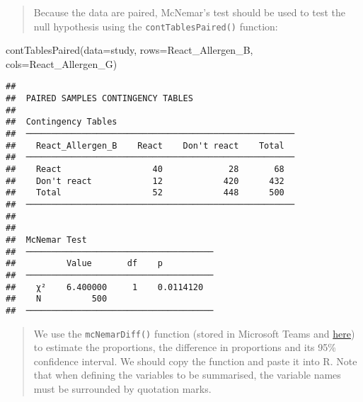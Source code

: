 \documentclass[
]{memoir}
\newenvironment{Shaded}{\begin{snugshade}}{\end{snugshade}}
\newcommand{\AttributeTok}[1]{\textcolor[rgb]{0.77,0.63,0.00}{#1}}
\newcommand{\FunctionTok}[1]{\textcolor[rgb]{0.00,0.00,0.00}{#1}}
\newcommand{\NormalTok}[1]{#1}
\begin{document}
\begin{quote}
Because the data are paired, McNemar's test should be used to test the null hypothesis using the \texttt{contTablesPaired()} function:
\end{quote}

\begin{Shaded}
\begin{Highlighting}[]
\FunctionTok{contTablesPaired}\NormalTok{(}\AttributeTok{data=}\NormalTok{study,}
                 \AttributeTok{rows=}\NormalTok{React\_Allergen\_B,}
                 \AttributeTok{cols=}\NormalTok{React\_Allergen\_G)}
\end{Highlighting}
\end{Shaded}

\begin{verbatim}
## 
##  PAIRED SAMPLES CONTINGENCY TABLES
## 
##  Contingency Tables                                    
##  ───────────────────────────────────────────────────── 
##    React_Allergen_B    React    Don't react    Total   
##  ───────────────────────────────────────────────────── 
##    React                  40             28       68   
##    Don't react            12            420      432   
##    Total                  52            448      500   
##  ───────────────────────────────────────────────────── 
## 
## 
##  McNemar Test                          
##  ───────────────────────────────────── 
##          Value       df    p           
##  ───────────────────────────────────── 
##    χ²    6.400000     1    0.0114120   
##    N          500                      
##  ─────────────────────────────────────
\end{verbatim}

\begin{quote}
We use the \texttt{mcNemarDiff()} function (stored in Microsoft Teams and \href{https://gist.githubusercontent.com/timothydobbins/525d25271b04b2ea72aae70c4aac8b01/raw/6b69f5b229d50daeac4c2f4cf4331e88b0c65717/mcNemarDiff.R}{here}) to estimate the proportions, the difference in proportions and its 95\% confidence interval. We should copy the function and paste it into R. Note that when defining the variables to be summarised, the variable names must be surrounded by quotation marks.
\end{quote}
\end{document}
